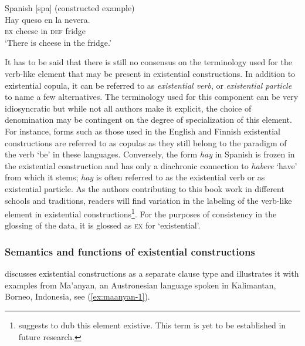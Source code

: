 \documentclass[output=paper,chinesefont,colorlinks,citecolor=brown]{langscibook}
\begin{document}
\begin{exe}
\ex Spanish [spa] (constructed example)\label{ex:spanish-1}\\
\gll Hay queso en la nevera.\\
\textsc{ex}	cheese in \textsc{def} fridge\\
\glt \textquoteleft There is cheese in the fridge.’
\end{exe}
It has to be said that there is still no consensus on the terminology used for the verb-like element that may be present in existential constructions. In addition to existential copula, it can be referred to as \textit{existential verb}, or \textit{existential particle} to name a few alternatives. The terminology used for this component can be very idiosyncratic but while not all authors make it explicit, the choice of denomination may be contingent on the degree of specialization of this element. For instance, forms such as those used in the English and Finnish existential constructions are referred to as copulas as they still belong to the paradigm of the verb ‘be’ in these languages. Conversely, the form \textit{hay} in Spanish is frozen in the existential construction and has only a diachronic connection to \textit{habere} ‘have’ from which it stems; \textit{hay} is often referred to as the existential verb or as existential particle. As the authors contributing to this book work in different schools and traditions, readers will find variation in the labeling of the verb-like element in existential constructions\footnote{\citet{haspelmath2021} suggests to dub this element existive. This term is yet to be established in future research.}. For the purposes of consistency in the glossing of the data, it is glossed as \textsc{ex} for ‘existential’.

\subsubsection{Semantics and functions of existential constructions}\label{sect:semantics-of-ex}\label{sec:intro:2.2.3}
\citet[240--243]{dryer2007a} discusses existential constructions as a separate clause type and illustrates it with examples from Ma’anyan, an Austronesian language spoken in Kalimantan, Borneo, Indonesia, see (\ref{ex:maanyan-1}).
\end{document}
